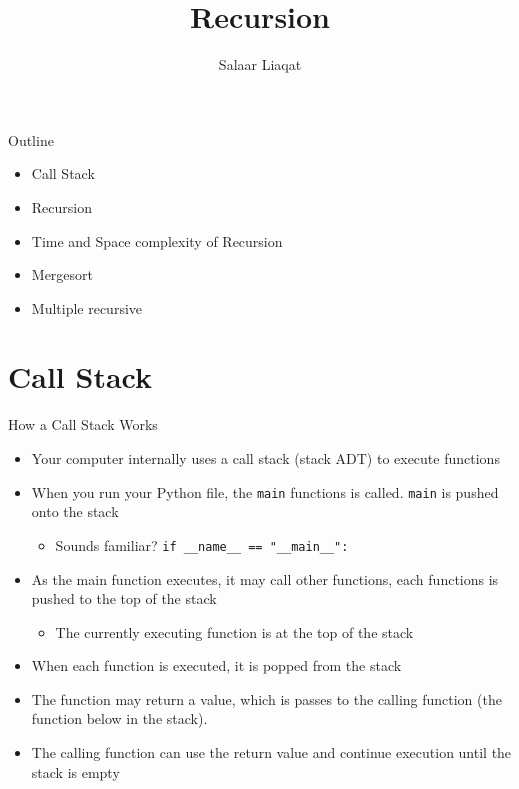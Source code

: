 \documentclass[
  ignorenonframetext,
]{beamer}
\title{Recursion}
\author{Salaar Liaqat}
\date{}
\institute{Data Sciences Institute, UofT}
\providecommand{\tightlist}{%
  \setlength{\itemsep}{0pt}\setlength{\parskip}{0pt}}\usepackage{longtable,booktabs,array}
\begin{document}
\frame{\titlepage}
\ifdefined\Shaded\renewenvironment{Shaded}{\begin{tcolorbox}[frame hidden, interior hidden, sharp corners, boxrule=0pt, breakable, borderline west={3pt}{0pt}{shadecolor}, enhanced]}{\end{tcolorbox}}\fi

\begin{frame}{Outline}
\protect\hypertarget{outline}{}
\begin{itemize}
\item
  Call Stack
\item
  Recursion
\item
  Time and Space complexity of Recursion
\item
  Mergesort
\item
  Multiple recursive
\end{itemize}
\end{frame}

\hypertarget{call-stack}{%
\section{Call Stack}\label{call-stack}}

\begin{frame}[fragile]{How a Call Stack Works}
\protect\hypertarget{how-a-call-stack-works}{}
\begin{itemize}
\item
  Your computer internally uses a call stack (stack ADT) to execute
  functions
\item
  When you run your Python file, the \texttt{main} functions is called.
  \texttt{main} is pushed onto the stack

  \begin{itemize}
  \tightlist
  \item
    Sounds familiar? \texttt{if\ \_\_name\_\_\ ==\ "\_\_main\_\_":}
  \end{itemize}
\item
  As the main function executes, it may call other functions, each
  functions is pushed to the top of the stack

  \begin{itemize}
  \tightlist
  \item
    The currently executing function is at the top of the stack
  \end{itemize}
\item
  When each function is executed, it is popped from the stack
\item
  The function may return a value, which is passes to the calling
  function (the function below in the stack).
\item
  The calling function can use the return value and continue execution
  until the stack is empty
\end{itemize}
\end{frame}
\end{document}
